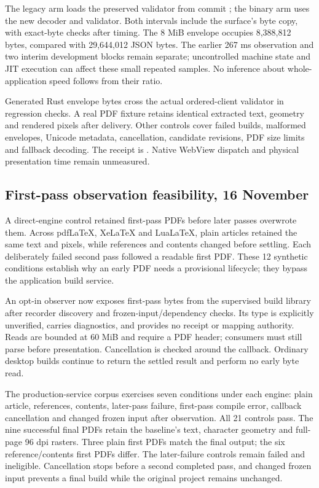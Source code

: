 The legacy arm loads the preserved validator from commit
; the binary arm uses the new decoder and validator. Both
intervals include the surface's byte copy, with exact-byte checks after
timing. The 8 MiB envelope occupies 8,388,812 bytes, compared with
29,644,012 JSON bytes. The earlier 267 ms observation and two interim
development blocks remain separate; uncontrolled machine state and JIT
execution can affect these small repeated samples. No inference about
whole-application speed follows from their ratio.

Generated Rust envelope bytes cross the actual ordered-client validator
in regression checks. A real PDF fixture retains identical extracted text,
geometry and rendered pixels after delivery. Other controls cover failed
builds, malformed envelopes, Unicode metadata, cancellation, candidate
revisions, PDF size limits and fallback decoding. The receipt is
. Native WebView
dispatch and physical presentation time remain unmeasured.

\subsection{First-pass observation feasibility, 16 November}

A direct-engine control retained first-pass PDFs before later passes
overwrote them. Across pdf\LaTeX{}, Xe\LaTeX{} and Lua\LaTeX{}, plain
articles retained the same text and pixels, while references and contents
changed before settling. Each deliberately failed second pass followed a
readable first PDF. These 12 synthetic conditions establish why an early
PDF needs a provisional lifecycle; they bypass the application build service.

An opt-in observer now exposes first-pass bytes from the supervised build
library after recorder discovery and frozen-input/dependency checks. Its
type is explicitly unverified, carries diagnostics, and provides no receipt
or mapping authority. Reads are bounded at 60 MiB and require a PDF header;
consumers must still parse before presentation. Cancellation is checked
around the callback. Ordinary desktop builds continue to return the settled
result and perform no early byte read.

The production-service corpus exercises seven conditions under each engine:
plain article, references, contents, later-pass failure, first-pass compile
error, callback cancellation and changed frozen input after observation.
All 21 controls pass. The nine successful final PDFs retain the baseline's
text, character geometry and full-page 96 dpi rasters. Three plain first
PDFs match the final output; the six reference/contents first PDFs differ.
The later-failure controls remain failed and ineligible. Cancellation stops
before a second completed pass, and changed frozen input prevents a final
build while the original project remains unchanged.

